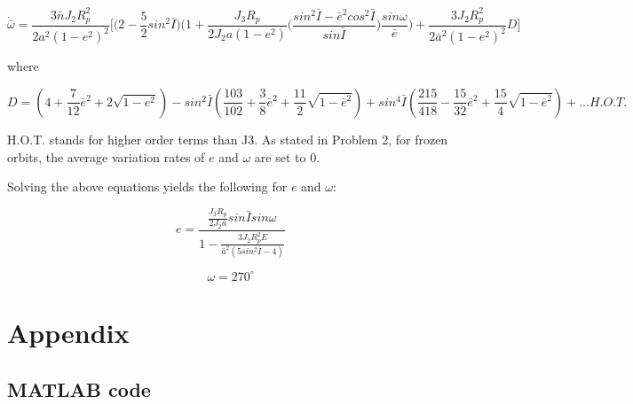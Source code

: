 \documentclass[conf]{new-aiaa}
\begin{document}
\begin{equation}
	\dot{\bar{\omega}} = \frac{3 \bar{n} J_2 R_p^2}{2 a^2 (1-e^2)^2} \Bigg[ \Big( 2 - \frac{5}{2} sin^2 \bar{I} \Big) \Big( 1 + \frac{J_3 R_p}{2 J_2 a(1-e^2)} \big( \frac{sin^2 \bar{I} - \bar{e}^2 cos^2 \bar{I}}{sin \bar{I}} \big) \frac{sin \omega}{\bar{e}} \Big) + \frac{3 J_2 R_p^2}{2 \bar{a}^2 ( 1 - e^2 )^2} D \Bigg]
\end{equation}

where 

\begin{equation}
	D = (4 + \frac{7}{12} \bar{e}^2 + 2 \sqrt{1 - e^2} ) - sin^2 \bar{I}( \frac{103}{102} + \frac{3}{8} \bar{e}^2 + \frac{11}{2} \sqrt{1 - \bar{e}^2} ) + sin^4 \bar{I}(\frac{215}{418} - \frac{15}{32} \bar{e}^2 + \frac{15}{4} \sqrt{1 - \bar{e}^2} ) + ... H.O.T. 
\end{equation}

H.O.T. stands for higher order terms than J3. As stated in Problem 2, for frozen orbits, the average variation rates of $e$ and $\omega$ are set to 0. 

Solving the above equations yields the following for $e$ and $\omega$: 

\begin{equation}
	e = \frac{ \frac{J_3 R_p}{ 2 J_2 \bar{a} } sin \bar{I} sin{\omega} }{ 1 - \frac{ 3 J_2 R_p^2 E }{ \bar{a}^2 ( 5 sin^2 \bar{I} - 4 ) } }
\end{equation}

\begin{equation}
	\omega = 270 ^\circ
\end{equation}



\section*{Appendix} 

\subsection*{MATLAB code} 
\end{document}
